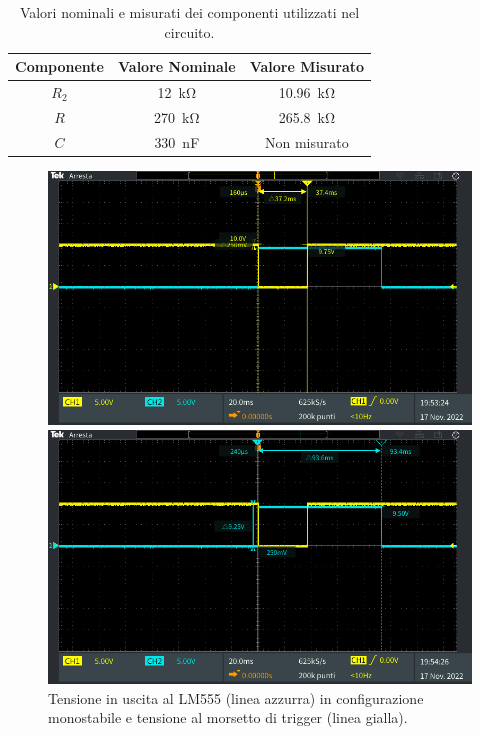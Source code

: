 \def\arraystretch{1.3}
\begin{table}[b!]
	\centering
	\begin{tabular}{|c|c|c|}
		\hline
		Componente	& Valore Nominale & Valore Misurato \\ \hline
		$R_2$ &\SI{12}{\kilo\ohm} & \SI{10.96}{\kilo\ohm} \\ \hline
		$R$ &\SI{270}{\kilo\ohm} & \SI{265.8}{\kilo\ohm} \\ \hline
		$C$ &\SI{330}{\nano\farad} & Non misurato \\ \hline
	\end{tabular}
	\caption{Valori nominali e misurati dei componenti utilizzati nel circuito.}
	\label{tab:valori_componenti_1}
\end{table}
\begin{figure}[tbh]
	\centering
	\begin{minipage}{.496\textwidth}
		\includegraphics[width=\linewidth]{./ImageFiles/Laboratorio 5/TEK00005.PNG}
	\end{minipage}
	\begin{minipage}{.496\textwidth}
		\includegraphics[width=\linewidth]{./ImageFiles/Laboratorio 5/TEK00006.PNG}
	\end{minipage}
	\caption{Tensione in uscita al LM555 (linea azzurra) in configurazione monostabile e tensione al morsetto di trigger (linea gialla).}
	\label{fig:circuito_1_scope}
\end{figure}



